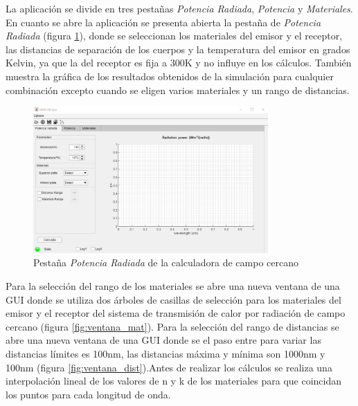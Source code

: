 La aplicación se divide en tres pestañas \textit{Potencia Radiada}, \textit{Potencia} y \textit{Materiales}. En cuanto se abre la aplicación se presenta abierta la pestaña de \textit{Potencia Radiada} (figura \ref{fig:pestana_PotenciaRadiada}), donde se seleccionan los materiales del emisor y el receptor, las distancias de separación de los cuerpos y la temperatura del emisor en grados Kelvin, ya que la del receptor es fija a 300K y no influye en los cálculos. También muestra la gráfica de los resultados obtenidos de la simulación para cualquier combinación excepto cuando se eligen varios materiales y un rango de distancias.\\ 
\begin{figure}[H]
	\centering
		\includegraphics[width=0.80\textwidth]{figuras/pestana_PotenciaRadiada.png}
	\caption{Pestaña \textit{Potencia Radiada} de la calculadora de campo cercano}
	\label{fig:pestana_PotenciaRadiada}
\end{figure}
Para la selección del rango de los materiales se abre una nueva ventana de una GUI donde se utiliza dos árboles de casillas de selección para los materiales del emisor y el receptor del sistema de transmisión de calor por radiación de campo cercano (figura \ref{fig:ventana_mat}). Para la selección del rango de distancias se abre una nueva ventana de una GUI donde se el paso entre para variar las distancias límites es 100nm, las distancias máxima y mínima son 1000nm y 100nm (figura \ref{fig:ventana_dist}).Antes de realizar los cálculos se realiza una interpolación lineal de los valores de n y k de los materiales para que coincidan los puntos para cada longitud de onda.\\\\
